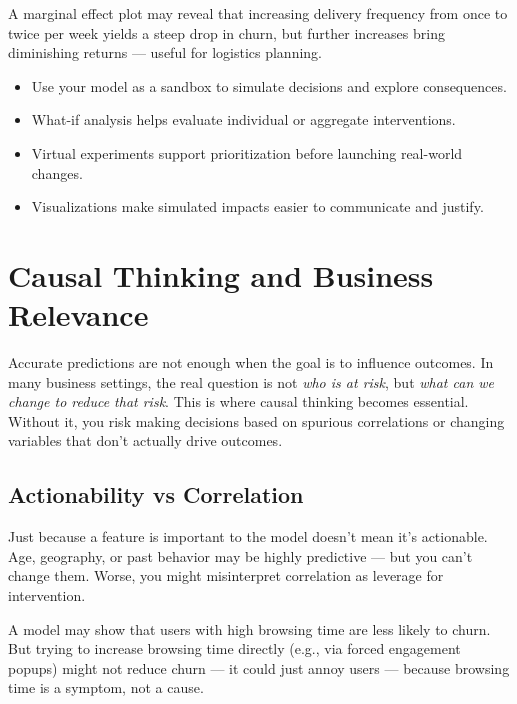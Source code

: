 \documentclass[12pt,openany]{book}
\begin{document}
\begin{examplebox}
A marginal effect plot may reveal that increasing delivery frequency from once to twice per week yields a steep drop in churn, but further increases bring diminishing returns — useful for logistics planning.
\end{examplebox}

\begin{summarybox}
\begin{itemize}
  \item Use your model as a sandbox to simulate decisions and explore consequences.
  \item What-if analysis helps evaluate individual or aggregate interventions.
  \item Virtual experiments support prioritization before launching real-world changes.
  \item Visualizations make simulated impacts easier to communicate and justify.
\end{itemize}
\end{summarybox}




\chapter{Causal Thinking and Business Relevance}

Accurate predictions are not enough when the goal is to influence outcomes. In many business settings, the real question is not \textit{who is at risk}, but \textit{what can we change to reduce that risk}. This is where causal thinking becomes essential. Without it, you risk making decisions based on spurious correlations or changing variables that don't actually drive outcomes.

\section{Actionability vs Correlation}

Just because a feature is important to the model doesn't mean it's actionable. Age, geography, or past behavior may be highly predictive — but you can’t change them. Worse, you might misinterpret correlation as leverage for intervention.

\begin{examplebox}
A model may show that users with high browsing time are less likely to churn. But trying to increase browsing time directly (e.g., via forced engagement popups) might not reduce churn — it could just annoy users — because browsing time is a symptom, not a cause.
\end{examplebox}
\end{document}
